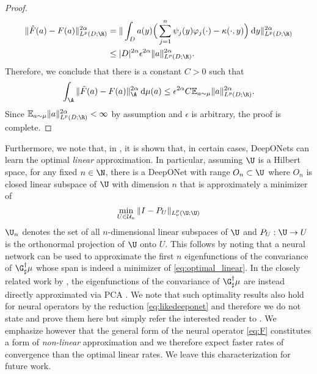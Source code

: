 \begin{proof}
\begin{align*}
    \|\hat{F}(a) - F(a)\|_{L^p(D;\R)}^{2\alpha} &= \|\int_D a(y) \Big ( \sum_{j=1}^n \psi_j(y) \varphi_j(\cdot) - \kappa(\cdot,y) \Big ) \: \text{d}y \|_{L^p(D;\R)}^{2\alpha} \\
    &\leq |D|^{2\alpha} \epsilon^{2 \alpha} \|a\|^{2\alpha}_{L^p(D;\R)}.
\end{align*}
Therefore, we conclude that there is a constant \(C > 0\) such that
\[\int_{\A} \|\tilde{F}(a) - F(a)\|_{\A}^{2\alpha} \: \text{d} \mu(a) \leq \epsilon^{2\alpha} C \mathbb{E}_{a \sim \mu} \|a\|^{2\alpha}_{L^p(D;\R)}.\]
Since \(\mathbb{E}_{a \sim \mu} \|a\|^{2\alpha}_{L^p(D;\R)} < \infty\) by assumption and \(\epsilon\) is arbitrary, the proof is complete.
\end{proof}

Furthermore, we note that, in \cite{lanthaler2021error}, it is shown that, in certain cases, DeepONets can learn the optimal \textit{linear} approximation. In particular, assuming \(\U\) is a Hilbert space, for any fixed \(n \in \N\), there is a DeepONet with range \(O_n \subset \U\) where 
\(O_n\) is closed linear subspace of \(\U\) with dimension \(n\) that is approximately a minimizer of 
\begin{equation}
    \label{eq:optimal_linear}
    \min_{U \in \mathcal{U}_n} \|I - P_U\|_{L^p_{\nu} (\U;\U)}
\end{equation}
 \(\U_n\) denotes the set of all \(n\)-dimensional linear subspaces of \(\U\) and \(P_U : \U \to U\) is the orthonormal projection of \(\U\) onto \(U\). This follows by noting that a neural network can be used to approximate the first \(n\) eigenfunctions of the convariance of \(\G^\dagger_\sharp \mu\) whose span is indeed a minimizer of \eqref{eq:optimal_linear}. In the closely related work by \cite{Kovachki}, the eigenfunctions of the convariance of \(\G^\dagger_\sharp \mu\) are instead directly approximated via PCA \citep{blanchard2007statistical}. We note that such optimality results also hold for neural operators by the reduction \eqref{eq:likedeeponet} and therefore we do not state and prove them here but simply refer the interested reader to \cite{lanthaler2021error}. We emphasize however that the general form of the neural operator \eqref{eq:F} constitutes a form of \textit{non-linear} approximation and we therefore expect faster rates of convergence than the optimal linear rates. We leave this characterization for future work.

